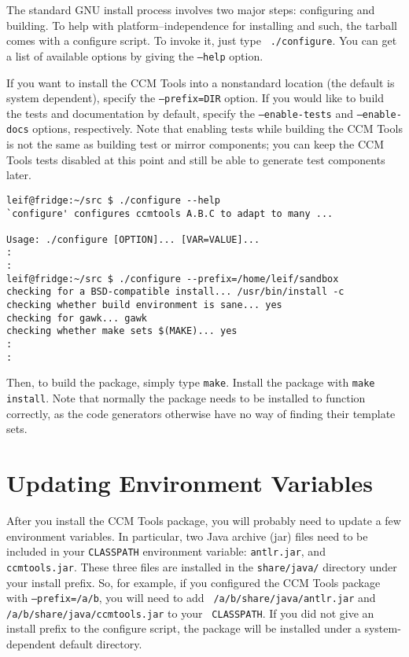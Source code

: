 The standard GNU install process involves two major steps: configuring and
building. To help with platform--independence for installing and such, the
tarball comes with a configure script. To invoke it, just type {\tt
./configure}. You can get a list of available options by giving the {\tt --help}
option.

If you want to install the CCM Tools into a nonstandard location (the default is
system dependent), specify the {\tt --prefix=DIR} option. If you would like to
build the tests and documentation by default, specify the {\tt --enable-tests}
and {\tt --enable-docs} options, respectively. Note that enabling tests while
building the CCM Tools is not the same as building test or mirror components;
you can keep the CCM Tools tests disabled at this point and still be able to
generate test components later.

\begin{verbatim}
leif@fridge:~/src $ ./configure --help
`configure' configures ccmtools A.B.C to adapt to many ...

Usage: ./configure [OPTION]... [VAR=VALUE]...
:
:
leif@fridge:~/src $ ./configure --prefix=/home/leif/sandbox
checking for a BSD-compatible install... /usr/bin/install -c
checking whether build environment is sane... yes
checking for gawk... gawk
checking whether make sets $(MAKE)... yes
:
:
\end{verbatim}

Then, to build the package, simply type {\tt make}. Install the package with
{\tt make install}. Note that normally the package needs to be installed to
function correctly, as the code generators otherwise have no way of finding
their template sets.

\section{Updating Environment Variables}

After you install the CCM Tools package, you will probably need to update a few
environment variables. In particular, two Java archive (jar) files need to be
included in your {\tt CLASSPATH} environment variable: {\tt antlr.jar}, and {\tt
ccmtools.jar}. These three files are installed in the {\tt share/java/}
directory under your install prefix. So, for example, if you configured the CCM
Tools package with {\tt --prefix=/a/b}, you will need to add {\tt
/a/b/share/java/antlr.jar} and {\tt /a/b/share/java/ccmtools.jar} to your {\tt
CLASSPATH}. If you did not give an install prefix to the configure script, the
package will be installed under a system-dependent default directory.
